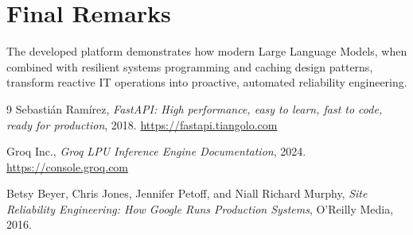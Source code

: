 \documentclass[12pt,a4paper]{report}
\begin{document}
\section{Final Remarks}
The developed platform demonstrates how modern Large Language Models, when combined with resilient systems programming and caching design patterns, transform reactive IT operations into proactive, automated reliability engineering.

\begin{thebibliography}{9}
Sebastián Ramírez, \emph{FastAPI: High performance, easy to learn, fast to code, ready for production}, 2018. \url{https://fastapi.tiangolo.com}

Groq Inc., \emph{Groq LPU Inference Engine Documentation}, 2024. \url{https://console.groq.com}

Betsy Beyer, Chris Jones, Jennifer Petoff, and Niall Richard Murphy, \emph{Site Reliability Engineering: How Google Runs Production Systems}, O'Reilly Media, 2016.
\end{thebibliography}
\end{document}
